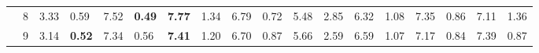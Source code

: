 \documentclass[conference]{IEEEtran}
\begin{document}
\begin{table}[]
\begin{tabular}{|cl|ll|ll|ll|ll|ll|ll|ll|ll|}
		\multicolumn{1}{|c|}{}                    & 8          & \multicolumn{1}{l|}{3.33}          & 0.59          & \multicolumn{1}{l|}{7.52}           & \textbf{0.49} & \multicolumn{1}{l|}{\textbf{7.77}}  & 1.34          & \multicolumn{1}{l|}{6.79}           & 0.72          & \multicolumn{1}{l|}{5.48}                 & 2.85  & \multicolumn{1}{l|}{6.32}  & 1.08 & \multicolumn{1}{l|}{7.35}           & 0.86          & \multicolumn{1}{l|}{7.11}           & 1.36          \\ \cline{2-18} 
		\multicolumn{1}{|c|}{}                    & 9          & \multicolumn{1}{l|}{3.14}          & \textbf{0.52} & \multicolumn{1}{l|}{7.34}           & 0.56          & \multicolumn{1}{l|}{\textbf{7.41}}  & 1.20          & \multicolumn{1}{l|}{6.70}           & 0.87          & \multicolumn{1}{l|}{5.66}                 & 2.59  & \multicolumn{1}{l|}{6.59}  & 1.07 & \multicolumn{1}{l|}{7.17}           & 0.84          & \multicolumn{1}{l|}{7.39}           & 0.87          \\ \hline
	\end{tabular}
\end{table}
\end{document}
